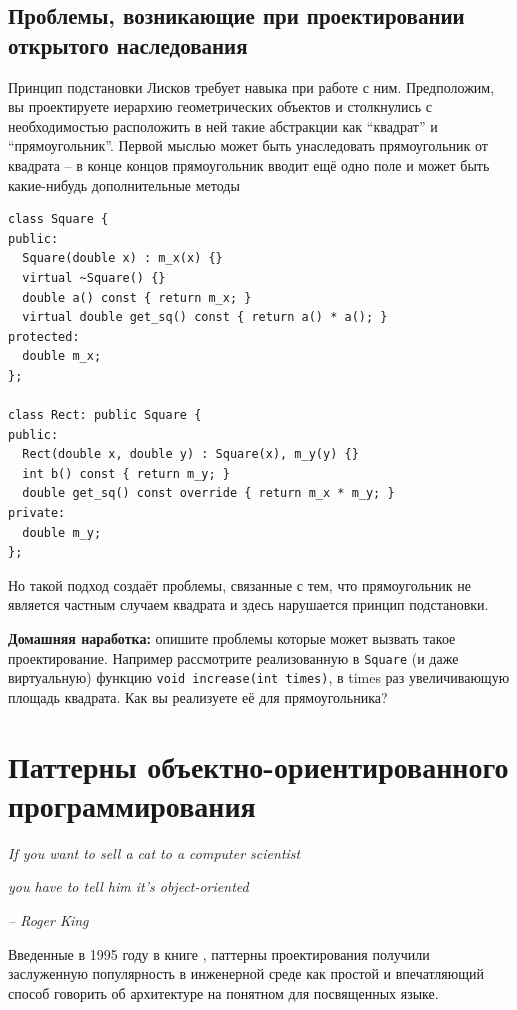 \documentclass[a4paper,12pt,oneside]{book}
\begin{document}
\subsection{Проблемы, возникающие при проектировании открытого наследования}\label{InhProblems}

Принцип подстановки Лисков требует навыка при работе с ним. Предположим, вы проектируете иерархию геометрических объектов и столкнулись с необходимостью расположить в ней такие абстракции как ``квадрат'' и ``прямоугольник''. Первой мыслью может быть унаследовать прямоугольник от квадрата – в конце концов прямоугольник вводит ещё одно поле и может быть какие-нибудь дополнительные методы

\begin{lstlisting}
class Square {
public:
  Square(double x) : m_x(x) {}
  virtual ~Square() {}
  double a() const { return m_x; }
  virtual double get_sq() const { return a() * a(); }
protected:
  double m_x;
};

class Rect: public Square {
public:
  Rect(double x, double y) : Square(x), m_y(y) {}
  int b() const { return m_y; }
  double get_sq() const override { return m_x * m_y; }
private:
  double m_y;
};
\end{lstlisting}

Но такой подход создаёт проблемы, связанные с тем, что прямоугольник не является частным случаем квадрата и здесь нарушается принцип подстановки. 

\textbf{Домашняя наработка:} опишите проблемы которые может вызвать такое проектирование. Например рассмотрите реализованную в \lstinline!Square! (и даже виртуальную) функцию \lstinline!void increase(int times)!, в times раз увеличивающую площадь квадрата. Как вы реализуете её для прямоугольника?

\pagebreak
\section{Паттерны объектно-ориентированного программирования}\label{DesPatterns}

\hfill\textit{If you want to sell a cat to a computer scientist}

\hfill\textit{you have to tell him it's object-oriented}{\vspace{0.5em}}

\hfill\textit{-- Roger King}

Введенные в 1995 году в книге \cite{DPatterns}, паттерны проектирования получили заслуженную популярность в инженерной среде как простой и впечатляющий способ говорить об архитектуре на понятном для посвященных языке.
\end{document}
